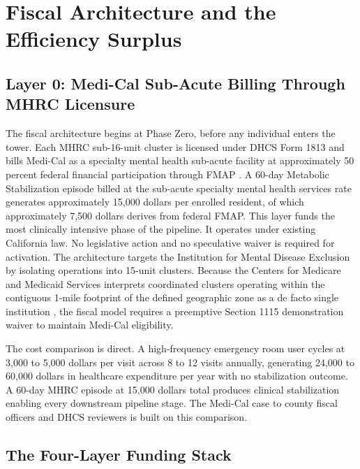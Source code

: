 \documentclass[12pt, letterpaper]{article}
\begin{document}
\clearpage
\section{Fiscal Architecture and the Efficiency Surplus}

\subsection{Layer 0: Medi-Cal Sub-Acute Billing Through MHRC Licensure}

The fiscal architecture begins at Phase Zero, before any individual enters the tower. Each MHRC sub-16-unit cluster is licensed under DHCS Form 1813 and bills Medi-Cal as a specialty mental health sub-acute facility at approximately 50 percent federal financial participation through FMAP \citep{dhcs_mhrc_2024, medi_cal_act_2024}. A 60-day Metabolic Stabilization episode billed at the sub-acute specialty mental health services rate generates approximately 15,000 dollars per enrolled resident, of which approximately 7,500 dollars derives from federal FMAP. This layer funds the most clinically intensive phase of the pipeline. It operates under existing California law. No legislative action and no speculative waiver is required for activation. The architecture targets the Institution for Mental Disease Exclusion by isolating operations into 15-unit clusters. Because the Centers for Medicare and Medicaid Services interprets coordinated clusters operating within the contiguous 1-mile footprint of the defined geographic zone as a de facto single institution \citep{cms_smd_imd_2017}, the fiscal model requires a preemptive Section 1115 demonstration waiver to maintain Medi-Cal eligibility.

The cost comparison is direct. A high-frequency emergency room user cycles at 3,000 to 5,000 dollars per visit across 8 to 12 visits annually, generating 24,000 to 60,000 dollars in healthcare expenditure per year with no stabilization outcome. A 60-day MHRC episode at 15,000 dollars total produces clinical stabilization enabling every downstream pipeline stage. The Medi-Cal case to county fiscal officers and DHCS reviewers is built on this comparison.

\subsection{The Four-Layer Funding Stack}
\end{document}
